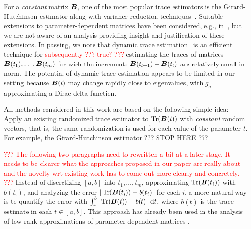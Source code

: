 For a \emph{constant} matrix $\boldsymbol{B}$, one of the most popular trace estimators is the Girard-Hutchinson estimator \cite{girard-1989-fast-montecarlo, hutchinson-1990-stochastic-estimator} along with variance reduction techniques~\cite{gambhir-2017-deflation-method, saibaba-2017-randomized-matrixfree, lin-2017-randomized-estimation, meyer-2021-hutch-optimal, persson-2022-improved-variants, chen-2023-krylovaware-stochastic, epperly-2024-xtrace-making}. Suitable extensions to parameter-dependent matrices have been considered, e.g., in~\cite{lin-2017-randomized-estimation,chen-2023-krylovaware-stochastic}, but we are not aware of an analysis providing insight and justification of these extensions. In passing, we note that dynamic trace estimation~\cite{dharangutte-2024-dynamic-trace,woodruff-2024-optimal-query} is an efficient technique for \textcolor{red}{subsequently ??? true? ???} estimating the traces of matrices $\boldsymbol{B}(t_1), \dots, \boldsymbol{B}(t_m)$ for wich the increments $\boldsymbol{B}(t_{i+1}) - \boldsymbol{B}(t_i)$ are relatively small in norm. The potential of dynamic trace estimation appears to be limited in our setting because $\boldsymbol{B}(t)$ may change rapidly close to eigenvalues, with $g_{\sigma}$ approximating a Dirac delta function.

All methods considered in this work are based on the following simple idea: Apply an existing randomized trace estimator to $\operatorname{Tr}(\boldsymbol{B}(t))$ with \emph{constant} random vectors, that is, the same randomization is used for each value of the parameter $t$. For example, the Girard-Hutchinson estimator ??? STOP HERE ???


\textcolor{red}{??? The following two paragraphs need to rewritten a bit at a later stage. It needs to be clearer what the approaches proposed in our paper are really about and the novelty wrt existing work has to come out more clearly and concretely. ???}
\color{black}
Instead of discretizing $[a, b]$ into $t_1, \ldots, t_m$, approximating $\operatorname{Tr}(\boldsymbol{B}(t_i))$ with $b(t_i)$, and analyzing the error $|\operatorname{Tr}(\boldsymbol{B}(t_i)) - b(t_i)|$ for each $i$, a more natural way is to quantify the error with $\int_{a}^{b} | \operatorname{Tr}(\boldsymbol{B}(t)) - b(t) |~\mathrm{d}t$, where $b(t)$ is the trace estimate in each $t \in [a, b]$. This approach has already been used in the analysis of low-rank approximations of parameter-dependent matrices \cite{kressner-2023-randomized-lowrank}.

